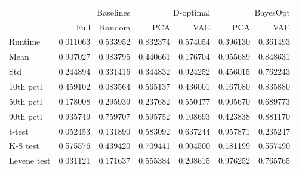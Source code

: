 \begin{tabular}{lrrrrrr}
\toprule
 & \multicolumn{2}{r}{Baselines} & \multicolumn{2}{r}{D-optimal} & \multicolumn{2}{r}{BayesOpt} \\
 & Full & Random & PCA & VAE & PCA & VAE \\
\midrule
Runtime & 0.011063 & 0.533952 & 0.832374 & 0.574054 & 0.396130 & 0.361493 \\
Mean & 0.907027 & 0.983795 & 0.440661 & 0.176704 & 0.955689 & 0.848631 \\
Std & 0.244894 & 0.331416 & 0.344832 & 0.924252 & 0.456015 & 0.762243 \\
10th pctl & 0.459102 & 0.083564 & 0.565137 & 0.436001 & 0.167080 & 0.835880 \\
50th pctl & 0.178008 & 0.295939 & 0.237682 & 0.550477 & 0.905670 & 0.689773 \\
90th pctl & 0.935749 & 0.759707 & 0.595752 & 0.108693 & 0.423838 & 0.881170 \\
t-test & 0.052453 & 0.131890 & 0.583092 & 0.637244 & 0.957871 & 0.235247 \\
K-S test & 0.575576 & 0.439420 & 0.709441 & 0.904500 & 0.181199 & 0.557490 \\
Levene test & 0.031121 & 0.171637 & 0.555384 & 0.208615 & 0.976252 & 0.765765 \\
\bottomrule
\end{tabular}

